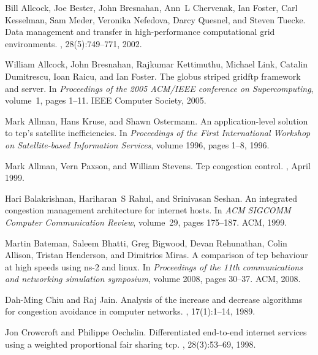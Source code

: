 \documentclass[a4paper, conference]{IEEEtran}
\begin{document}
\begin{thebibliography}{10}

Bill Allcock, Joe Bester, John Bresnahan, Ann~L Chervenak, Ian Foster, Carl
  Kesselman, Sam Meder, Veronika Nefedova, Darcy Quesnel, and Steven Tuecke.
\newblock Data management and transfer in high-performance computational grid
  environments.
, 28(5):749--771, 2002.

William Allcock, John Bresnahan, Rajkumar Kettimuthu, Michael Link, Catalin
  Dumitrescu, Ioan Raicu, and Ian Foster.
\newblock The globus striped gridftp framework and server.
\newblock In {\em Proceedings of the 2005 ACM/IEEE conference on
  Supercomputing}, volume~1, pages 1--11. IEEE Computer Society, 2005.

Mark Allman, Hans Kruse, and Shawn Ostermann.
\newblock An application-level solution to tcp's satellite inefficiencies.
\newblock In {\em Proceedings of the First International Workshop on
  Satellite-based Information Services}, volume 1996, pages 1--8, 1996.

Mark Allman, Vern Paxson, and William Stevens.
\newblock Tcp congestion control.
, April 1999.

Hari Balakrishnan, Hariharan~S Rahul, and Srinivasan Seshan.
\newblock An integrated congestion management architecture for internet hosts.
\newblock In {\em ACM SIGCOMM Computer Communication Review}, volume~29, pages
  175--187. ACM, 1999.

Martin Bateman, Saleem Bhatti, Greg Bigwood, Devan Rehunathan, Colin Allison,
  Tristan Henderson, and Dimitrios Miras.
\newblock A comparison of tcp behaviour at high speeds using ns-2 and linux.
\newblock In {\em Proceedings of the 11th communications and networking
  simulation symposium}, volume 2008, pages 30--37. ACM, 2008.

Dah-Ming Chiu and Raj Jain.
\newblock Analysis of the increase and decrease algorithms for congestion
  avoidance in computer networks.
, 17(1):1--14, 1989.

Jon Crowcroft and Philippe Oechslin.
\newblock Differentiated end-to-end internet services using a weighted
  proportional fair sharing tcp.
, 28(3):53--69, 1998.


\end{thebibliography}
\end{document}
